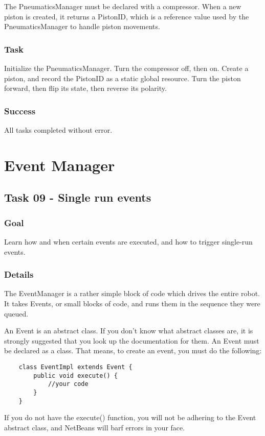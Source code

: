 \documentclass[a4paper]{article}
\begin{document}
The PneumaticsManager must be declared with a compressor. When a new piston is created, it returns a PistonID, which is a reference value used by the PneumaticsManager to handle piston movements.
\subsubsection{Task} Initialize the PneumaticsManager. Turn the compressor off, then on. Create a piston, and record the PistonID as a static global resource. Turn the piston forward, then flip its state, then reverse its polarity.
\subsubsection{Success} All tasks completed without error.


\section{Event Manager}\setcounter{subsection}{8}

\subsection{Task 09 - Single run events}
\subsubsection{Goal} Learn how and when certain events are executed, and how to trigger single-run events.
\subsubsection{Details} The EventManager is a rather simple block of code which drives the entire robot. It takes Events, or small blocks of code, and runs them in the sequence they were queued.

An Event is an abstract class. If you don't know what abstract classes are, it is strongly suggested that you look up the documentation for them. An Event must be declared as a class. That means, to create an event, you must do the following:

\begin{verbatim}
	class EventImpl extends Event {
		public void execute() {
			//your code
		}
	}
\end{verbatim}

If you do not have the execute() function, you will not be adhering to the Event abstract class, and NetBeans will barf errors in your face.
\end{document}
